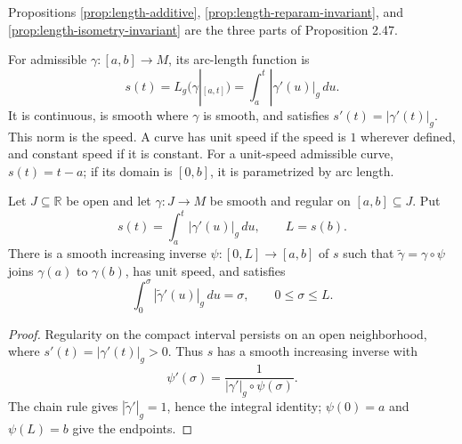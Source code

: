Propositions \ref{prop:length-additive}, \ref{prop:length-reparam-invariant}, and \ref{prop:length-isometry-invariant} are the three parts of Proposition 2.47.

\begin{exercise}
\label{exer:prove-prop-247}
\leanok
{}
\end{exercise}

For admissible $\gamma:[a,b]\to M$, its arc-length function is
\[
s(t)=L_g(\gamma|_{[a,t]})=\int_a^t|\gamma'(u)|_g\,du.
\]
It is continuous, is smooth where $\gamma$ is smooth, and satisfies $s'(t)=|\gamma'(t)|_g$. This norm is the speed. A curve has unit speed if the speed is $1$ wherever defined, and constant speed if it is constant. For a unit-speed admissible curve, $s(t)=t-a$; if its domain is $[0,b]$, it is parametrized by arc length.

\begin{proposition}
\label{prop:regular-curve-unit-speed-reparam}
\leanok
{}
Let $J\subseteq\mathbb R$ be open and let $\gamma:J\to M$ be smooth and regular on $[a,b]\subseteq J$. Put
\[
s(t)=\int_a^t|\gamma'(u)|_g\,du,\qquad L=s(b).
\]
There is a smooth increasing inverse $\psi:[0,L]\to[a,b]$ of $s$ such that $\widetilde\gamma=\gamma\circ\psi$ joins $\gamma(a)$ to $\gamma(b)$, has unit speed, and satisfies
\[
\int_0^\sigma|\widetilde\gamma'(u)|_g\,du=\sigma,\qquad 0\le\sigma\le L.
\]
\end{proposition}
\begin{proof}
\leanok
{}
\sketch Regularity on the compact interval persists on an open neighborhood, where $s'(t)=|\gamma'(t)|_g>0$. Thus $s$ has a smooth increasing inverse with
\[
\psi'(\sigma)=\frac1{|\gamma'|_g\circ\psi(\sigma)}.
\]
The chain rule gives $|\widetilde\gamma'|_g=1$, hence the integral identity; $\psi(0)=a$ and $\psi(L)=b$ give the endpoints.
\end{proof}

